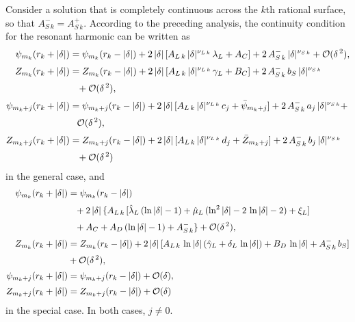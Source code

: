 \documentclass[12pt,prb,aps]{revtex4-1}
\begin{document}
Consider a solution that is completely continuous across the $k$th rational surface, so that $A_{S\,k}^-=A_{S\,k}^+$. According to the
preceding analysis, the continuity condition for the resonant harmonic can be written as
\begin{align}
\psi_{m_k}(r_k+|\delta|) &= \psi_{m_k}(r_k-|\delta|) + 2\,|\delta|\,[A_{L\,k}\,|\delta|^{\nu_{L\,k}}\,\lambda_L + A_C] + 2\,A_{S\,k}^-\,|\delta|^{\nu_{S\,k}}+ {\cal O}(\delta^{\,2}),\\[0.5ex]
Z_{m_k} (r_k+|\delta|) &=  Z_{m_k}(r_k-|\delta|) + 2\,|\delta|\,[A_{L\,k}\,|\delta|^{\nu_{L\,k}}\,\gamma_L + B_C] + 2\,A_{S\,k}^-\,b_S\,|\delta|^{\nu_{S\,k}} 
\nonumber\\[0.5ex]&\phantom{=}+ {\cal O}(\delta^{\,2}),\\[0.5ex]
\psi_{m_k+j}(r_k+|\delta|) &= \psi_{m_k+j}(r_k-|\delta|) +2\,|\delta|\,[A_{L\,k}\,|\delta|^{\nu_{L\,k}}\,c_j + \bar{\psi}_{m_k+j}] + 2\,A_{S\,k}^-\,a_j\,|\delta|^{\nu_{S\,k}}+\nonumber\\[0.5ex]&\phantom{=} {\cal O}(\delta^{\,2}),\\[0.5ex]
Z_{m_k+j}(r_k+|\delta|) &= Z_{m_k+j}(r_k-|\delta|) +2\,|\delta|\,[A_{L\,k}\,|\delta|^{\nu_{L\,k}}\,d_j + \bar{Z}_{m_k+j}] + 2\,A_{S\,k}^-\,b_j\,|\delta|^{\nu_{S\,k}}
\nonumber\\[0.5ex]&\phantom{=}+ {\cal O}(\delta^{\,2})
\end{align}
in the general case, and 
\begin{align}
\psi_{m_k}(r_k+|\delta|) &= \psi_{m_k}(r_k-|\delta|) \nonumber\\[0.5ex]
&\phantom{=}+ 2\,|\delta|\,\{A_{L\,k}\,[\hat{\lambda}_L\,(\ln|\delta|-1)+\hat{\mu}_L\,(\ln^2|\delta|-2\,\ln|\delta|-2)+ \xi_L]\nonumber\\[0.5ex]
&\phantom{=}+ A_C
+A_D\,(\ln|\delta|-1) + A_{S\,k}^-\}+ {\cal O}(\delta^{\,2}),\\[0.5ex]
Z_{m_k} (r_k+|\delta|) &=  Z_{m_k}(r_k-|\delta|) + 2\,|\delta|\,[A_{L\,k}\,\ln|\delta| \,(\hat{\gamma}_L+\delta_L\,\ln|\delta|)+ B_D\,\ln|\delta|
+A_{S\,k}^-\,b_{S}]\nonumber\\[0.5ex]&+ {\cal O}(\delta^{\,2}),\\[0.5ex]
\psi_{m_k+j}(r_k+|\delta|) &= \psi_{m_k+j}(r_k-|\delta|)+{\cal O}(\delta),\\[0.5ex]
Z_{m_k+j}(r_k+|\delta|) &= Z_{m_k+j}(r_k-|\delta|)+{\cal O}(\delta)
\end{align}
in the special case. In both cases, $j\neq 0$.
\end{document}
